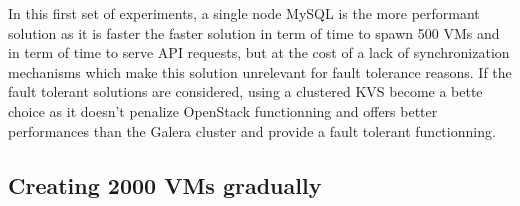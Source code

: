 In this first set of experiments, a single node MySQL is the more performant
solution as it is faster the faster solution in term of time to spawn 500 VMs
and in term of time to serve API requests, but at the cost of a lack of
synchronization mechanisms which make this solution unrelevant for fault
tolerance reasons. If the fault tolerant solutions are considered, using a
clustered KVS become a bette choice as it doesn't penalize OpenStack
functionning and offers better performances than the Galera cluster and provide
a fault tolerant functionning.






\subsection{Creating 2000 VMs gradually}



